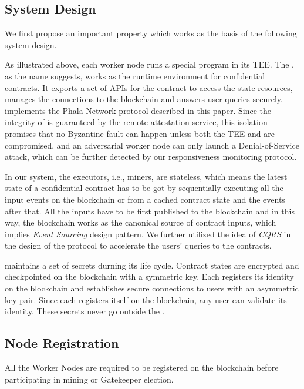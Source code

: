 \subsection{System Design}

We first propose an important property which works as the basis of the following system design.

As illustrated above, each worker node runs a special program \pruntime in its TEE. The \pruntime, as the name suggests, works as the runtime environment for confidential contracts. It exports a set of APIs for the contract to access the state resources, manages the connections to the blockchain and answers user queries securely.
\pruntime implements the Phala Network protocol described in this paper. Since the integrity of \pruntime is guaranteed by the remote attestation service, this isolation promises that no Byzantine fault can happen unless both the TEE and \pruntime are compromised, and an adversarial worker node can only launch a Denial-of-Service attack, which can be further detected by our responsiveness monitoring protocol.

In our system, the executors, i.e., miners, are stateless, which means the latest state of a confidential contract has to be got by sequentially executing all the input events on the blockchain or from a cached contract state and the events after that. All the inputs have to be first published to the blockchain and in this way, the blockchain works as the canonical source of contract inputs, which implies \textit{Event Sourcing} design pattern. We further utilized the idea of \textit{CQRS} in the design of the protocol to accelerate the users' queries to the contracts.

\pruntime maintains a set of secrets durning its life cycle. Contract states are encrypted and checkpointed on the blockchain with a symmetric key. Each \pruntime registers its identity on the blockchain and establishes secure connections to users with an asymmetric key pair. Since each \pruntime registers itself on the blockchain, any user can validate its identity. These secrets never go outside the \pruntime. 



\subsection{Node Registration}

All the Worker Nodes are required to be registered on the blockchain before participating in mining or Gatekeeper election.

